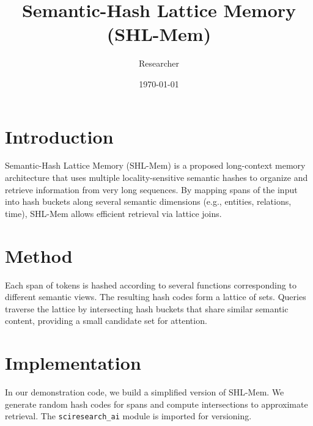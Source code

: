 \documentclass{article}
\title{Semantic-Hash Lattice Memory (SHL-Mem)}
\author{Researcher}
\date{\today}
\begin{document}
\maketitle

\section{Introduction}
Semantic-Hash Lattice Memory (SHL-Mem) is a proposed long-context memory
architecture that uses multiple locality-sensitive semantic hashes to organize
and retrieve information from very long sequences. By mapping spans of the
input into hash buckets along several semantic dimensions (e.g., entities,
relations, time), SHL-Mem allows efficient retrieval via lattice joins.

\section{Method}
Each span of tokens is hashed according to several functions corresponding
to different semantic views. The resulting hash codes form a lattice of sets.
Queries traverse the lattice by intersecting hash buckets that share
similar semantic content, providing a small candidate set for attention.

\section{Implementation}
In our demonstration code, we build a simplified version of SHL-Mem.
We generate random hash codes for spans and compute intersections to
approximate retrieval. The \texttt{sciresearch\_ai} module is imported
for versioning.
\end{document}
